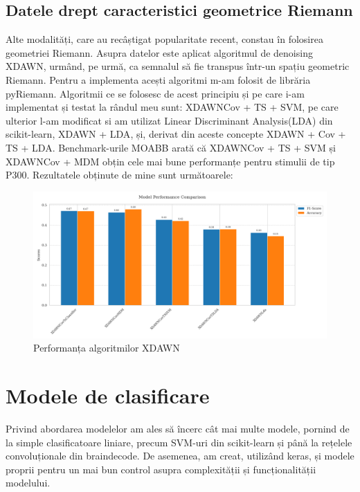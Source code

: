 \subsection{Datele drept caracteristici geometrice Riemann}
Alte modalități, care au recâștigat popularitate recent, constau în folosirea geometriei Riemann. Asupra datelor este aplicat algoritmul de denoising XDAWN\cite{xdawn}, urmând, pe urmă, ca semnalul să fie transpus într-un spațiu geometric Riemann. Pentru a implementa acești algoritmi m-am folosit de librăria pyRiemann\cite{pyriemann}. Algoritmii ce se folosesc de acest principiu și pe care i-am implementat și testat la rândul meu sunt: XDAWNCov + TS + SVM\cite{xdawncovtssvm}, pe care ulterior l-am modificat si am utilizat Linear Discriminant Analysis(LDA) din scikit-learn\cite{scikit-learn}, XDAWN + LDA\cite{xdawnlda}, și, derivat din aceste concepte XDAWN + Cov + TS + LDA. Benchmark-urile MOABB\cite{moabb}  arată că XDAWNCov + TS + SVM și XDAWNCov + MDM obțin cele mai bune performanțe pentru stimulii de tip P300. Rezultatele obținute de mine sunt următoarele:

\vspace{1em}
\begin{figure}[h]
    \centering
    \includegraphics[width=1\linewidth]{comparison_xdawn.png}
    \caption{Performanța algoritmilor XDAWN}
    \label{fig:enter-label}
\end{figure}

\section{Modele de clasificare}
Privind abordarea modelelor am ales să încerc cât mai multe modele, pornind de la simple clasificatoare liniare, precum SVM-uri din scikit-learn\cite{scikit-learn} și până la rețelele convoluționale din braindecode\cite{braindecode}. De asemenea, am creat, utilizând keras\cite{keras}, și modele proprii pentru un mai bun control asupra complexității și funcționalității modelului.
